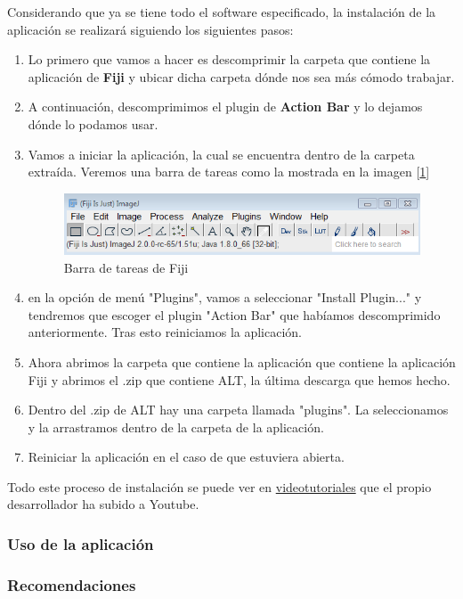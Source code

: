 Considerando que ya se tiene todo el software especificado,
la instalación de la aplicación se realizará siguiendo los siguientes pasos:
\begin{enumerate}
	\item Lo primero que vamos a hacer es descomprimir la carpeta que contiene la aplicación de \textbf{Fiji} y ubicar dicha carpeta dónde nos sea más cómodo trabajar.
	\item A continuación, descomprimimos el plugin de \textbf{Action Bar} y lo dejamos dónde lo podamos usar.
	\item Vamos a iniciar la aplicación, la cual se encuentra dentro de la carpeta extraída. Veremos una barra de tareas como la mostrada en la imagen [\ref{fig:barra_de_tareas}]
	\begin{figure}
		\centering
		\includegraphics[width=0.7\linewidth]{img/barra}
		\caption{Barra de tareas de Fiji}
		\label{fig:barra_de_tareas}
	\end{figure}
	
	\item en la opción de menú "Plugins", vamos a seleccionar "Install Plugin..."	y tendremos que escoger el plugin "Action Bar" que habíamos descomprimido anteriormente. Tras esto reiniciamos la aplicación.
	\item Ahora abrimos la carpeta que contiene la aplicación que contiene la aplicación Fiji y abrimos el .zip que contiene ALT, la última descarga que hemos hecho. 
	\item Dentro del .zip de ALT hay una carpeta llamada "plugins". La seleccionamos y la arrastramos dentro de la carpeta de la aplicación.
	\item Reiniciar la aplicación en el caso de que estuviera abierta.
\end{enumerate}
Todo este proceso de instalación se puede ver en \href{https://www.youtube.com/watch?v=G6ib950iDvQ}{videotutoriales} que el propio desarrollador ha subido a Youtube.
\subsubsection{Uso de la aplicación}
\subsubsection{Recomendaciones}